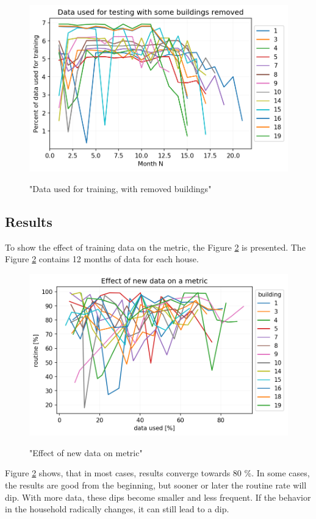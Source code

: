 \begin{figure}[H]
	\centering
	\caption{"Data used for training, with removed buildings"}
	\includegraphics[width=.7\textwidth]{Figures/EC/DYN/data_used_for_testing.png}
	\label{fig:data_used_for_testing}
\end{figure}

\subsection{Results}

To show the effect of training data on the metric, the Figure \ref{fig:efect_of_data_on_metric} is presented.
The Figure \ref{fig:efect_of_data_on_metric} contains 12 months of 
data for each house.

\begin{figure}[H]
	\centering
	\caption{"Effect of new data on metric"}
	\includegraphics[width=.7\textwidth]{Figures/EC/DYN/efect_of_data_on_metric.png}
	\label{fig:efect_of_data_on_metric}
\end{figure}

Figure \ref{fig:efect_of_data_on_metric} shows, that in most cases, results converge towards 80 \%. 
In some cases, the results are good from the beginning, but sooner or later the routine rate will dip. 
With more data, these dips become smaller and less frequent. 
If the behavior in the household radically changes, it can still lead to a dip.

